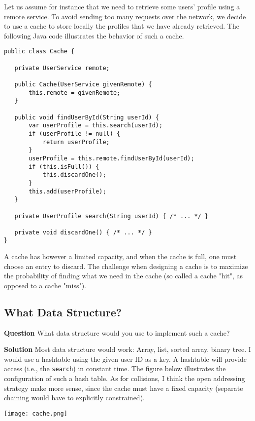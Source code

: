 \documentclass[11pt]{article}
\begin{document}
Let us assume for instance that we need to retrieve some users'
profile using a remote service. To avoid sending too many requests
over the network, we decide to use a cache to store locally the
profiles that we have already retrieved. The following Java code
illustrates the behavior of such a cache.

\begin{verbatim}
public class Cache {

   private UserService remote;

   public Cache(UserService givenRemote) {
       this.remote = givenRemote;
   }

   public void findUserById(String userId) {
       var userProfile = this.search(userId);
       if (userProfile != null) {
           return userProfile;
       }
       userProfile = this.remote.findUserById(userId);
       if (this.isFull()) {
           this.discardOne();
       }
       this.add(userProfile);
   }

   private UserProfile search(String userId) { /* ... */ }

   private void discardOne() { /* ... */ }
}
\end{verbatim}

A cache has however a limited capacity, and when the cache is full,
one must choose an entry to discard. The challenge when designing
a cache is to maximize the probability of finding what we need in
the cache (so called a cache "hit", as opposed to a cache "miss").

\subsection{What Data Structure?}
\label{sec:orgd357903}

\textbf{Question} What data structure would you use to implement such a
cache?

\textbf{Solution} Most data structure would work: Array, list, sorted
array, binary tree. I would use a hashtable using the given user ID
as a key. A hashtable will provide access (i.e., the \texttt{search}) in
constant time. The figure below illustrates the configuration of
such a hash table. As for collisions, I think the open addressing
strategy make more sense, since the cache must have a fixed capacity
(separate chaining would have to explicitly constrained).

\begin{center}
\texttt{[image: cache.png]}
\end{center}
\end{document}
